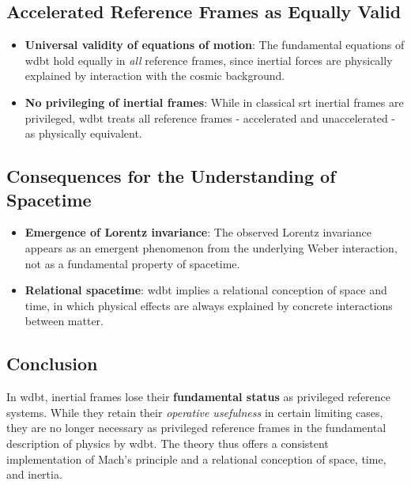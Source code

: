 \subsection{Accelerated Reference Frames as Equally Valid}

\begin{itemize}
    \item \textbf{Universal validity of equations of motion}: The fundamental equations of \gls{wdbt} hold equally in \emph{all} reference frames, since inertial forces are physically explained by interaction with the cosmic background.
    \item \textbf{No privileging of inertial frames}: While in classical \gls{srt} inertial frames are privileged, \gls{wdbt} treats all reference frames - accelerated and unaccelerated - as physically equivalent.
\end{itemize}

\subsection{Consequences for the Understanding of Spacetime}

\begin{itemize}
    \item \textbf{Emergence of Lorentz invariance}: The observed Lorentz invariance appears as an emergent phenomenon from the underlying Weber interaction, not as a fundamental property of spacetime.
    \item \textbf{Relational spacetime}: \gls{wdbt} implies a relational conception of space and time, in which physical effects are always explained by concrete interactions between matter.
\end{itemize}

\subsection{Conclusion}

In \gls{wdbt}, inertial frames lose their \textbf{fundamental status} as privileged reference systems. While they retain their \emph{operative usefulness} in certain limiting cases, they are no longer necessary as privileged reference frames in the fundamental description of physics by \gls{wdbt}. The theory thus offers a consistent implementation of Mach's principle and a relational conception of space, time, and inertia.